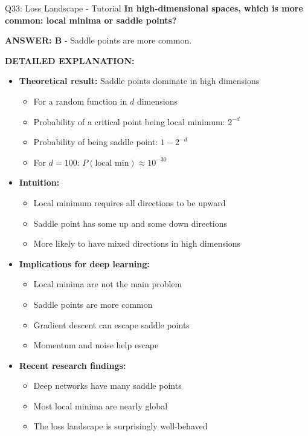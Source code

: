 \documentclass[8pt]{beamer}
\begin{document}
	\begin{frame}{Q33: Loss Landscape - Tutorial}
		\fontsize{6.5}{7.5}\selectfont
		\textbf{In high-dimensional spaces, which is more common: local minima or saddle points?}
		
		\vspace{0.05cm}
		\textcolor{myblue}{\textbf{ANSWER: B}} - Saddle points are more common.
		
		\vspace{0.05cm}
		\textbf{DETAILED EXPLANATION:}
		\begin{itemize}
			\item \textbf{Theoretical result:} Saddle points dominate in high dimensions
			\begin{itemize}
				\item For a random function in $d$ dimensions
				\item Probability of a critical point being local minimum: $2^{-d}$
				\item Probability of being saddle point: $1 - 2^{-d}$
				\item For $d = 100$: $P(\text{local min}) \approx 10^{-30}$
			\end{itemize}
			\item \textbf{Intuition:}
			\begin{itemize}
				\item Local minimum requires all directions to be upward
				\item Saddle point has some up and some down directions
				\item More likely to have mixed directions in high dimensions
			\end{itemize}
			\item \textbf{Implications for deep learning:}
			\begin{itemize}
				\item Local minima are not the main problem
				\item Saddle points are more common
				\item Gradient descent can escape saddle points
				\item Momentum and noise help escape
			\end{itemize}
			\item \textbf{Recent research findings:}
			\begin{itemize}
				\item Deep networks have many saddle points
				\item Most local minima are nearly global
				\item The loss landscape is surprisingly well-behaved
			\end{itemize}
		\end{itemize}
		

\end{frame}
\end{document}
